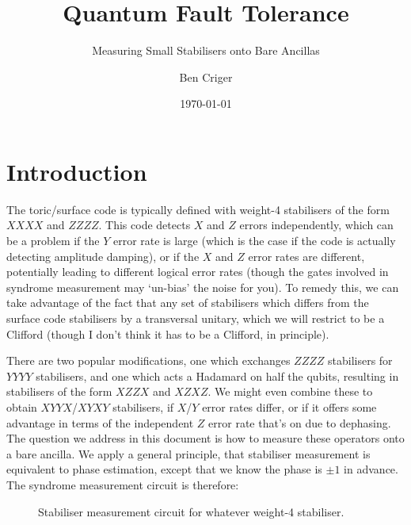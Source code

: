 \documentclass[a4paper, english]{scrartcl}
\title{Quantum Fault Tolerance}
\subtitle{Measuring Small Stabilisers onto Bare Ancillas}
\author{Ben Criger}
\date{\today}
\begin{document}
\maketitle
\section{Introduction}
The toric/surface code is typically defined with weight-4 stabilisers of the form $XXXX$ and $ZZZZ$. 
This code detects $X$ and $Z$ errors independently, which can be a problem if the $Y$ error rate is large (which is the case if the code is actually detecting amplitude damping), or if the $X$ and $Z$ error rates are different, potentially leading to different logical error rates (though the gates involved in syndrome measurement may `un-bias' the noise for you). 
To remedy this, we can take advantage of the fact that any set of stabilisers which differs from the surface code stabilisers by a transversal unitary, which we will restrict to be a Clifford (though I don't think it has to be a Clifford, in principle).

There are two popular modifications, one which exchanges $ZZZZ$ stabilisers for $YYYY$ stabilisers, and one which acts a Hadamard on half the qubits, resulting in stabilisers of the form $XZZX$ and $XZXZ$.
We might even combine these to obtain $XYYX$/$XYXY$ stabilisers, if $X$/$Y$ error rates differ, or if it offers some advantage in terms of the independent $Z$ error rate that's on due to dephasing. 
The question we address in this document is how to measure these operators onto a bare ancilla. 
We apply a general principle, that stabiliser measurement is equivalent to phase estimation, except that we know the phase is $\pm 1$ in advance.
The syndrome measurement circuit is therefore: 
\begin{figure}[!h]
\centering

\caption{Stabiliser measurement circuit for whatever weight-4 stabiliser.}
\end{figure}
\end{document}
